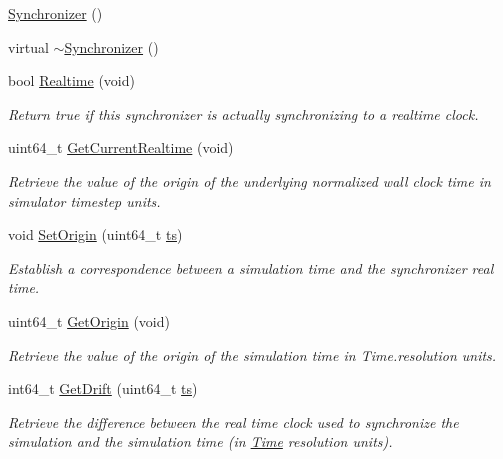 \begin{DoxyCompactItemize}
\item 
\hyperlink{classns3_1_1Synchronizer_af46994e83dabd4e0ccba2fd6bd9e103e}{Synchronizer} ()
\item 
virtual \hyperlink{classns3_1_1Synchronizer_afa65e36404a996f73105effd9b0e6854}{$\sim$\+Synchronizer} ()
\item 
bool \hyperlink{classns3_1_1Synchronizer_a081d3415c6fb711cbea2feb37862428c}{Realtime} (void)
\begin{DoxyCompactList}\small\item\em Return true if this synchronizer is actually synchronizing to a realtime clock. \end{DoxyCompactList}\item 
uint64\+\_\+t \hyperlink{classns3_1_1Synchronizer_a9199c28473a6298009ef8210b02c23c5}{Get\+Current\+Realtime} (void)
\begin{DoxyCompactList}\small\item\em Retrieve the value of the origin of the underlying normalized wall clock time in simulator timestep units. \end{DoxyCompactList}\item 
void \hyperlink{classns3_1_1Synchronizer_a28e1732f6db4e918491cc58a3236e544}{Set\+Origin} (uint64\+\_\+t \hyperlink{mmwave_2model_2fading-traces_2fading__trace__generator_8m_ada841f58d7be618bfbc76c87e7d44086}{ts})
\begin{DoxyCompactList}\small\item\em Establish a correspondence between a simulation time and the synchronizer real time. \end{DoxyCompactList}\item 
uint64\+\_\+t \hyperlink{classns3_1_1Synchronizer_a59bfe6d62f571698c23c639950169a73}{Get\+Origin} (void)
\begin{DoxyCompactList}\small\item\em Retrieve the value of the origin of the simulation time in Time.\+resolution units. \end{DoxyCompactList}\item 
int64\+\_\+t \hyperlink{classns3_1_1Synchronizer_abcd1705e4558427df5db87fcee62a015}{Get\+Drift} (uint64\+\_\+t \hyperlink{mmwave_2model_2fading-traces_2fading__trace__generator_8m_ada841f58d7be618bfbc76c87e7d44086}{ts})
\begin{DoxyCompactList}\small\item\em Retrieve the difference between the real time clock used to synchronize the simulation and the simulation time (in \hyperlink{classns3_1_1Time}{Time} resolution units). \end{DoxyCompactList}\item 

\end{DoxyCompactItemize}
